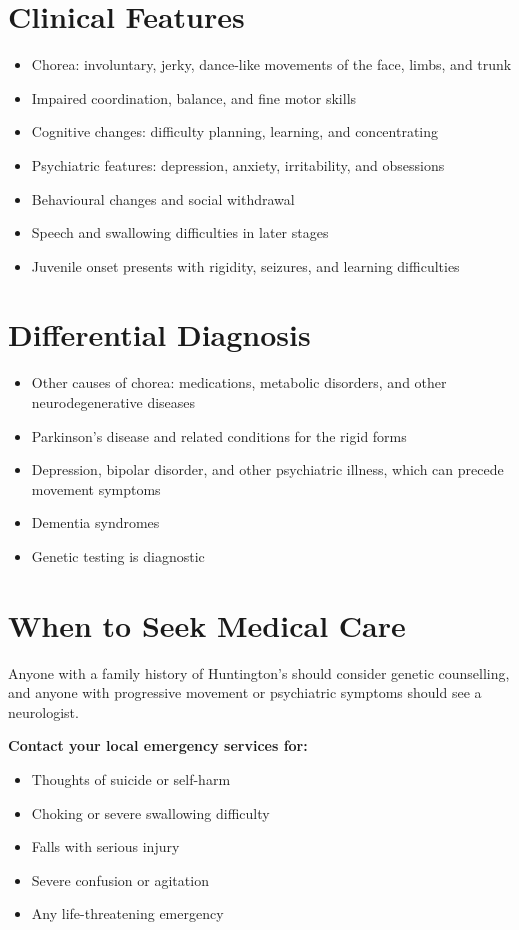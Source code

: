 \section*{Clinical Features}
\begin{itemize}
    \item Chorea: involuntary, jerky, dance-like movements of the face, limbs, and trunk
    \item Impaired coordination, balance, and fine motor skills
    \item Cognitive changes: difficulty planning, learning, and concentrating
    \item Psychiatric features: depression, anxiety, irritability, and obsessions
    \item Behavioural changes and social withdrawal
    \item Speech and swallowing difficulties in later stages
    \item Juvenile onset presents with rigidity, seizures, and learning difficulties
\end{itemize}

\section*{Differential Diagnosis}
\begin{itemize}
    \item Other causes of chorea: medications, metabolic disorders, and other neurodegenerative diseases
    \item Parkinson's disease and related conditions for the rigid forms
    \item Depression, bipolar disorder, and other psychiatric illness, which can precede movement symptoms
    \item Dementia syndromes
    \item Genetic testing is diagnostic
\end{itemize}

\section*{When to Seek Medical Care}
Anyone with a family history of Huntington's should consider genetic counselling, and anyone with progressive movement or psychiatric symptoms should see a neurologist.

\textbf{Contact your local emergency services for:}
\begin{itemize}
    \item Thoughts of suicide or self-harm
    \item Choking or severe swallowing difficulty
    \item Falls with serious injury
    \item Severe confusion or agitation
    \item Any life-threatening emergency
\end{itemize}

